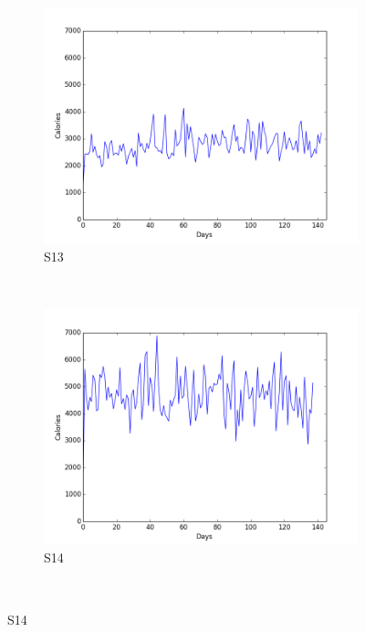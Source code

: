 \documentclass[12pt]{article} %
\begin{document}
\begin{figure}[H]
    \begin{subfigure}[b]{0.30\textwidth}
        \includegraphics[width=\textwidth]{img/graphs/13-calories-1}
        \caption{S13}
        \label{fig:s13cal}
    \end{subfigure}
    ~ %
    \begin{subfigure}[b]{0.30\textwidth}
        \includegraphics[width=\textwidth]{img/graphs/14-calories-1}
        \caption{S14}
        \label{fig:s14cal}
    \end{subfigure}
    ~ %

\end{figure}
\end{document}
